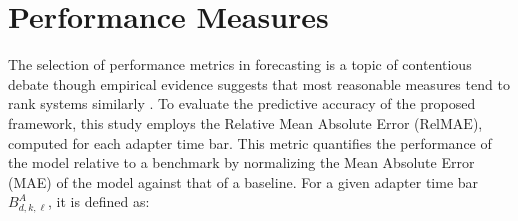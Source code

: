 \documentclass[10pt,a4paper,oneside]{article}
\begin{document}




\section{Performance Measures}
\label{sec:performance_measures}

The selection of performance metrics in forecasting is a topic of contentious debate though empirical evidence suggests that most reasonable measures tend to rank systems similarly \cite{Koutsandreas2021}. To evaluate the predictive accuracy of the proposed framework, this study employs the Relative Mean Absolute Error ($\mathrm{RelMAE}$), computed for each adapter time bar. This metric quantifies the performance of the model relative to a benchmark by normalizing the Mean Absolute Error (MAE) of the model against that of a baseline. For a given adapter time bar $B^A_{d, k, \ell}$, it is defined as:
\end{document}
